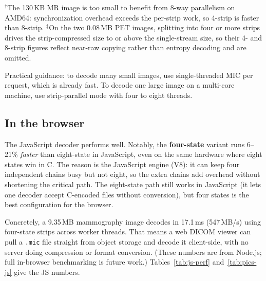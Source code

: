 \documentclass[journal]{IEEEtran}
\begin{document}
\begin{table}[htbp]
\vspace{2pt}
{\scriptsize $^\dagger$The 130\,KB MR image is too small to benefit from 8-way
parallelism on AMD64: synchronization overhead exceeds the per-strip work, so
4-strip is faster than 8-strip. $^\ddagger$On the two 0.08\,MB PET images,
splitting into four or more strips drives the strip-compressed size to or above
the single-stream size, so their 4- and 8-strip figures reflect near-raw
copying rather than entropy decoding and are omitted.}
\end{table}

Practical guidance: to decode many small images, use single-threaded MIC
per request, which is already fast. To decode one large image on a multi-core
machine, use strip-parallel mode with four to eight threads.

\subsection{In the browser}

The JavaScript decoder performs well. Notably, the \textbf{four-state}
variant runs 6--21\% \emph{faster} than eight-state in JavaScript, even on the
same hardware where eight states win in C. The reason is the JavaScript engine
(V8): it can keep four independent chains busy but not eight, so the extra
chains add overhead without shortening the critical path. The eight-state
path still works in JavaScript (it lets one decoder accept C-encoded files
without conversion), but four states is the best configuration for the
browser.

Concretely, a 9.35\,MB mammography image decodes in 17.1\,ms (547\,MB/s) using
four-state strips across worker threads. That means a web DICOM viewer can pull
a \texttt{.mic} file straight from object storage and decode it client-side,
with no server doing compression or format conversion. (These numbers are from
Node.js; full in-browser benchmarking is future work.)
Tables~\ref{tab:js-perf} and~\ref{tab:pics-js} give the JS numbers.
\end{document}
